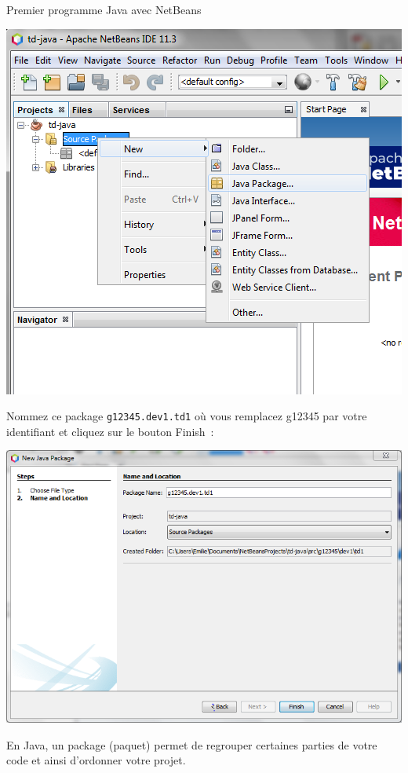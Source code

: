 \documentclass[a4paper,11pt]{style-esi/td}
\begin{document}
\begin{Tutoriel}{Premier programme Java avec NetBeans}
\begin{steps}
		\bigskip
		\begin{center}
			\includegraphics[scale=0.75]{images/anb113_newproject_package}
		\end{center}

		Nommez ce package \texttt{g12345.dev1.td1} où vous remplacez g12345 par votre identifiant et cliquez sur le bouton \og Finish\fg~:

		\bigskip
		\begin{center}
			\includegraphics[width=.9\textwidth]{images/anb113_newproject_package2}
		\end{center}

		En Java, un package (paquet) permet de regrouper certaines parties de votre code
		et ainsi d'ordonner votre projet.


\end{steps}
\end{Tutoriel}
\end{document}

